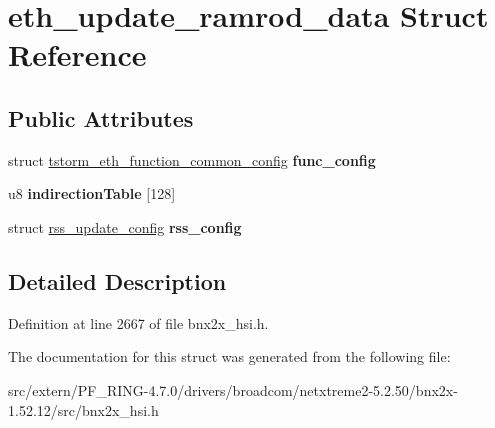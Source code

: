 \hypertarget{structeth__update__ramrod__data}{
\section{eth\_\-update\_\-ramrod\_\-data Struct Reference}
\label{structeth__update__ramrod__data}
}
\subsection*{Public Attributes}
\begin{DoxyCompactItemize}
\item 
\hypertarget{structeth__update__ramrod__data_af19064ab7f55b63d7e37f0fb29d0e132}{
struct \hyperlink{structtstorm__eth__function__common__config}{tstorm\_\-eth\_\-function\_\-common\_\-config} {\bfseries func\_\-config}}
\label{structeth__update__ramrod__data_af19064ab7f55b63d7e37f0fb29d0e132}

\item 
\hypertarget{structeth__update__ramrod__data_a967e3aab3edd89d88fa964f334e16094}{
u8 {\bfseries indirectionTable} \mbox{[}128\mbox{]}}
\label{structeth__update__ramrod__data_a967e3aab3edd89d88fa964f334e16094}

\item 
\hypertarget{structeth__update__ramrod__data_ab6625983a490c63788cad37ea5364cd6}{
struct \hyperlink{structrss__update__config}{rss\_\-update\_\-config} {\bfseries rss\_\-config}}
\label{structeth__update__ramrod__data_ab6625983a490c63788cad37ea5364cd6}

\end{DoxyCompactItemize}


\subsection{Detailed Description}


Definition at line 2667 of file bnx2x\_\-hsi.h.



The documentation for this struct was generated from the following file:\begin{DoxyCompactItemize}
\item 
src/extern/PF\_\-RING-\/4.7.0/drivers/broadcom/netxtreme2-\/5.2.50/bnx2x-\/1.52.12/src/bnx2x\_\-hsi.h\end{DoxyCompactItemize}
